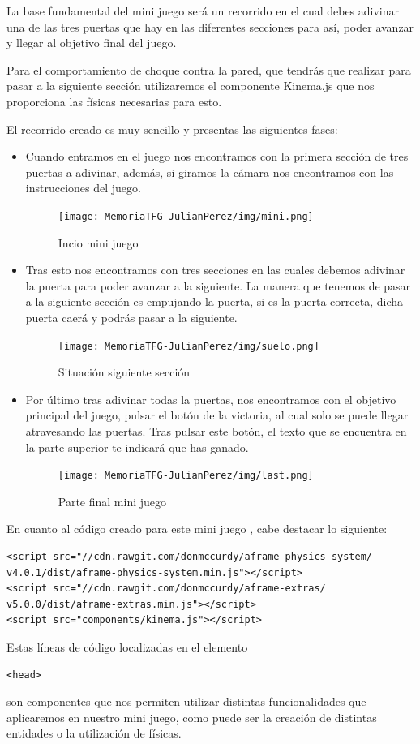 \documentclass[a4paper, 12pt]{book}
\begin{document}
La base fundamental del mini juego será un recorrido en el cual debes adivinar una de las tres puertas que hay en las diferentes secciones para así, poder avanzar y llegar al objetivo final del juego.

Para el comportamiento de choque contra la pared, que tendrás que realizar para pasar a la siguiente sección utilizaremos el componente Kinema.js que nos proporciona las físicas necesarias para esto. 

El recorrido creado es muy sencillo y presentas las siguientes fases:

\begin{itemize}
    \item Cuando entramos en el juego nos encontramos con la primera sección de tres puertas a adivinar, además, si giramos la cámara nos encontramos con las instrucciones del juego.
    \begin{figure}[H]
  \centering
  \texttt{[image: MemoriaTFG-JulianPerez/img/mini.png]}
  \caption{Incio mini juego}\label{scrum}
\end{figure}
    \item Tras esto nos encontramos con tres secciones en las cuales debemos adivinar la puerta para poder avanzar a la siguiente. La manera que tenemos de pasar a la siguiente sección es empujando la puerta, si es la puerta correcta, dicha puerta caerá y podrás pasar a la siguiente.
     \begin{figure}[H]
  \centering
  \texttt{[image: MemoriaTFG-JulianPerez/img/suelo.png]}
  \caption{Situación siguiente sección}\label{scrum}
\end{figure}
    \item Por último tras adivinar todas la puertas, nos encontramos con el objetivo principal del juego, pulsar el botón de la victoria, al cual solo se puede llegar atravesando las puertas. Tras pulsar este botón, el texto que se encuentra en la parte superior te indicará que has ganado.
         \begin{figure}[H]
  \centering
  \texttt{[image: MemoriaTFG-JulianPerez/img/last.png]}
  \caption{Parte final mini juego}\label{scrum}
\end{figure}

\end{itemize}

En cuanto al código creado para este mini juego , cabe destacar lo siguiente:
\begin{verbatim}
<script src="//cdn.rawgit.com/donmccurdy/aframe-physics-system/
v4.0.1/dist/aframe-physics-system.min.js"></script>
<script src="//cdn.rawgit.com/donmccurdy/aframe-extras/
v5.0.0/dist/aframe-extras.min.js"></script>
<script src="components/kinema.js"></script>
\end{verbatim}  
Estas líneas de código localizadas en el elemento \begin{verbatim}
<head>
\end{verbatim} son componentes que nos permiten utilizar distintas funcionalidades que aplicaremos en nuestro mini juego, como puede ser la creación de distintas entidades o la utilización de físicas.
\end{document}
